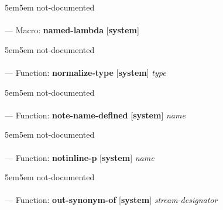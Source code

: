 \begin{adjustwidth}{5em}{5em}
not-documented
\end{adjustwidth}

\paragraph{}
\label{SYSTEM:NAMED-LAMBDA}
--- Macro: \textbf{named-lambda} [\textbf{system}] \textit{}

\begin{adjustwidth}{5em}{5em}
not-documented
\end{adjustwidth}

\paragraph{}
\label{SYSTEM:NORMALIZE-TYPE}
--- Function: \textbf{normalize-type} [\textbf{system}] \textit{type}

\begin{adjustwidth}{5em}{5em}
not-documented
\end{adjustwidth}

\paragraph{}
\label{SYSTEM:NOTE-NAME-DEFINED}
--- Function: \textbf{note-name-defined} [\textbf{system}] \textit{name}

\begin{adjustwidth}{5em}{5em}
not-documented
\end{adjustwidth}

\paragraph{}
\label{SYSTEM:NOTINLINE-P}
--- Function: \textbf{notinline-p} [\textbf{system}] \textit{name}

\begin{adjustwidth}{5em}{5em}
not-documented
\end{adjustwidth}

\paragraph{}
\label{SYSTEM:OUT-SYNONYM-OF}
--- Function: \textbf{out-synonym-of} [\textbf{system}] \textit{stream-designator}

